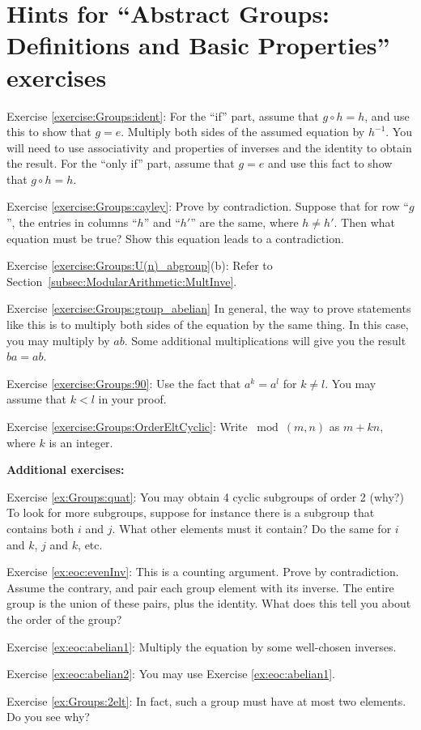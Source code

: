 \section{Hints for ``Abstract Groups: Definitions and Basic Properties'' exercises}
\label{sec:Groups:Hints}

\noindent Exercise \ref{exercise:Groups:ident}: For the ``if'' part, assume that $g \circ h = h$, and use this to show that $g = e$. Multiply both sides of the assumed equation by $h^{-1}$. You will need to use associativity and properties of inverses and the identity to obtain the result.  For the ``only if'' part, assume that $g=e$ and use this fact to show that $g \circ h = h$.

\noindent Exercise \ref{exercise:Groups:cayley}: Prove by contradiction. Suppose that for row ``$g$'', the entries in columns ``$h$'' and ``$h'$'' are the same, where $h \neq h'$.  Then what equation must be true? Show this equation leads to a contradiction.

\noindent Exercise \ref{exercise:Groups:U(n)_abgroup}(b): Refer to Section~\ref{subsec:ModularArithmetic:MultInve}.

\noindent Exercise \ref{exercise:Groups:group_abelian} In general, the way to prove statements like this is to multiply both sides of the equation by the same thing.  In this case, you may multiply by $ab$.  Some additional multiplications will give you the result $ba=ab$.

\noindent Exercise \ref{exercise:Groups:90}: Use the fact that $a^k = a^l$ for $k \neq l$.  You may assume that $k < l$ in your proof.

\noindent Exercise \ref{exercise:Groups:OrderEltCyclic}: Write $\bmod(m,n)$ as $m + kn$, where $k$ is an integer.

\bigskip

\textbf{Additional exercises:}

\noindent Exercise \ref{ex:Groups:quat}: You may obtain 4 cyclic subgroups of order 2 (why?)  To look for more subgroups, suppose for instance there is a subgroup that contains both $i$ and $j$.  What other elements must it contain?  Do the same for $i$ and $k$, $j$ and $k$, etc.

\noindent Exercise \ref{ex:eoc:evenInv}: This is a counting argument. Prove by contradiction. Assume the contrary, and pair each group element with its inverse. The entire group is the union of these pairs, plus the identity. What does this tell you about the order of the group?

\noindent Exercise \ref{ex:eoc:abelian1}: Multiply the equation by some well-chosen inverses.

\noindent Exercise \ref{ex:eoc:abelian2}: You may use Exercise \ref{ex:eoc:abelian1}.

\noindent Exercise \ref{ex:Groups:2elt}: In fact, such a group must have at most two elements. Do you see why?

